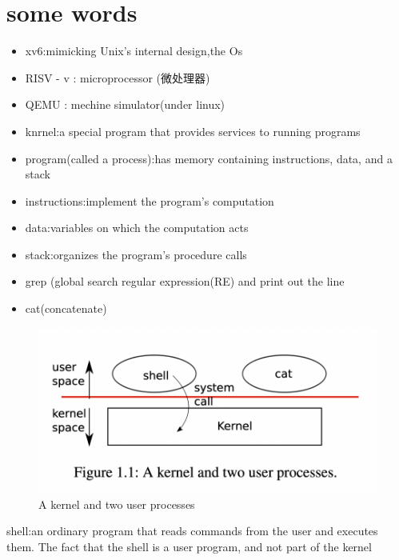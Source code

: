 \documentclass{thuemp}
\begin{document}
\section*{some words}
\begin{itemize}
  \item xv6:mimicking Unix's internal design,the Os
  \item RISV - v : microprocessor (微处理器)
  \item QEMU : mechine simulator(under linux)
  \item knrnel:a special program that provides services to running programs
  \item program(called a process):has memory containing instructions, data, and a stack
  \item instructions:implement the program’s computation
  \item data:variables on which the computation acts
  \item stack:organizes the program’s procedure calls
  \item grep (global search regular expression(RE) and print out the line
  \item cat(concatenate)
\end{itemize}

\begin{figure}[H]
	\centering
	\includegraphics[width=0.8\linewidth]{./image/1.1.png}
	\caption{A kernel and two user processes} 
	\label{png:1.1}
\end{figure}
shell:an ordinary program that reads commands 
from the user and executes them.
The fact that the shell is a user program, 
and not part of the kernel
\newpage
\end{document}
